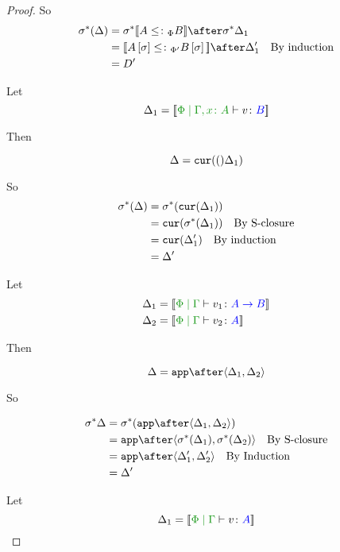 \documentclass{report}
\begin{document}
\begin{framed}
\begin{proof}
    So 
    \begin{align*}
        \si\star(\D) & = \si\star{\deno{A\subtypep B}}\after\si\star\D_1 \\
        & = \deno{A\ssi\subtypepp B\ssi}\after\D_1'\qt{By induction}\\
        & = D'
    \end{align*}
    
    Let \begin{equation}
        \D_1 = \deno{\etyperelation{\P}{\gax}{v}{B}}
    \end{equation}
    
    Then
    
    \begin{equation}
        \Delta = \texttt{cur}(()\Delta_1)\\
    \end{equation}
    
    So
    \begin{align*}
        \sigma^*(\Delta) & = \sigma^*(\texttt{cur}(\Delta_1))\\
        & = \texttt{cur}(\sigma^*(\Delta_1))\quad\text{By S-closure}\\
        & = \texttt{cur}(\Delta_1')\quad\text{By induction}\\
        & = \Delta'
    \end{align*}
    
    Let \begin{align*}
        \D_1 &= \deno{\gpetyperelation{v_1}{\ab}}\\
        \D_2 &= \deno{\gpetyperelation{v_2}{A}}
    \end{align*}
    
    Then
    
    \begin{equation}
        \D = \app\after\pr{\D_1}{\D_2}\\
    \end{equation}
    
    So
    
    \begin{align*}
        \si\star\D & = \si\star(\app\after\pr{\D_1}{\D_2})\\
        & = \app\after\pr{\si\star(\D_1)}{\si\star(\D_2)}\qt{By S-closure}\\
        & = \app\after\pr{\D_1'}{\D_2'}\qt{By Induction}\\
        & = \D'
    \end{align*}
    
    Let \begin{equation}
        \D_1 = \deno{\gpetyperelation{v}{A}}
    \end{equation}
    

\end{proof}
\end{framed}
\end{document}
